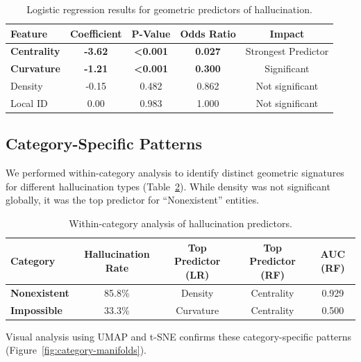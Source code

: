 \documentclass{article}
\begin{document}
\begin{table}[h]
    \centering
    \begin{tabular}{lcccc}
        \toprule
        \textbf{Feature} & \textbf{Coefficient} & \textbf{P-Value} & \textbf{Odds Ratio} & \textbf{Impact} \\
        \midrule
        \textbf{Centrality} & \textbf{-3.62} & \textbf{<0.001} & \textbf{0.027} & Strongest Predictor \\
        \textbf{Curvature} & \textbf{-1.21} & \textbf{<0.001} & \textbf{0.300} & Significant \\
        Density & -0.15 & 0.482 & 0.862 & Not significant \\
        Local ID & 0.00 & 0.983 & 1.000 & Not significant \\
        \bottomrule
    \end{tabular}
    \caption{Logistic regression results for geometric predictors of hallucination.}
    \label{tab:logistic-regression}
\end{table}


\subsection{Category-Specific Patterns}
We performed within-category analysis to identify distinct geometric signatures for different hallucination types (Table~\ref{tab:category-analysis}). While density was not significant globally, it was the top predictor for ``Nonexistent'' entities.

\begin{table}[h]
    \centering
    \begin{tabular}{lcccc}
        \toprule
        \textbf{Category} & \textbf{Hallucination Rate} & \textbf{Top Predictor (LR)} & \textbf{Top Predictor (RF)} & \textbf{AUC (RF)} \\
        \midrule
        \textbf{Nonexistent} & 85.8\% & Density & Centrality & 0.929 \\
        \textbf{Impossible} & 33.3\% & Curvature & Centrality & 0.500 \\
        \bottomrule
    \end{tabular}
    \caption{Within-category analysis of hallucination predictors.}
    \label{tab:category-analysis}
\end{table}

Visual analysis using UMAP and t-SNE confirms these category-specific patterns (Figure~\ref{fig:category-manifolds}).
\end{document}
